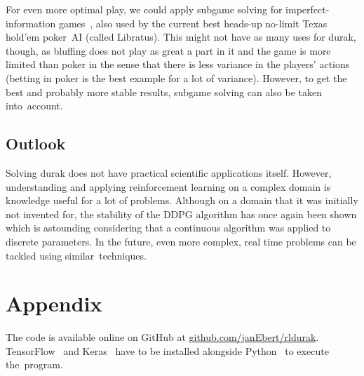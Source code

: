 \documentclass[a4paper,titlepage]{article}
\begin{document}
For even more optimal play, we could apply subgame solving for imperfect-information games~\cite{subgame}, also used by the current best heads-up no-limit Texas hold'em poker~AI (called Libratus). This might not have as many uses for durak, though, as bluffing does not play as great a part in it and the game is more limited than poker in the sense that there is less variance in the players' actions (betting in poker is the best example for a lot of variance). However, to get the best and probably more stable results, subgame solving can also be taken into~account.

\subsection{Outlook}

Solving durak does not have practical scientific applications itself. However, understanding and applying reinforcement learning on a complex domain is knowledge useful for a lot of problems. Although on a domain that it was initially not invented for, the stability of the DDPG algorithm has once again been shown which is astounding considering that a continuous algorithm was applied to discrete parameters. In the future, even more complex, real time problems can be tackled using similar~techniques.

\newpage

\section{Appendix}
\label{sec:appendix}

The code is available online on GitHub at \url{github.com/janEbert/rldurak}. TensorFlow~\cite{tensorflow} and Keras~\cite{keras} have to be installed alongside Python~\cite{python} to execute the~program. \bigskip
\end{document}
